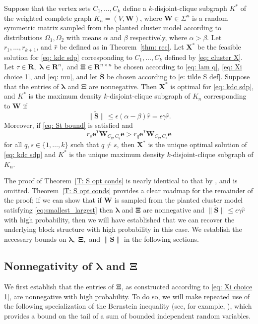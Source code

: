\documentclass[twoside,11pt]{article}
\newcommand{\R}{\mathbf{R}}
\newcommand{\St}{\bs{\tilde S}}
\newcommand{\e}{\bs {e}}
\newcommand{\bs}{\boldsymbol}
\newcommand{\X}{\bs {X}}
\newcommand{\W}{\bs {W}}
\newcommand{\0}{\bs{0}}
\begin{document}
{\begin{theorem} \label{T: S opt conds}
	Suppose that the vertex sets $C_1, \dots, C_k$ define a $k$-disjoint-clique subgraph $K^*$ of
	the weighted complete graph $K_n = (V, \W)$, where
	$\W \in \Sigma^n$ is a random symmetric matrix sampled from the planted cluster model
	according to distributions  $\Omega_1, \Omega_2$ with means $\alpha$ and $\beta$ respectively,
	where $\alpha > \beta$.
	Let $r_1, \dots, r_{k+1}$, and  $\hat r$ be defined as in Theorem~\ref{thm: rec}.
	Let $\X^*$ be the feasible solution for \eqref{eq: kdc sdp} corresponding to $C_1, \dots, C_k$ defined
	by \eqref{eq: cluster X}. Let $\tau \in \R,$ $\bs\lambda \in \R^n,$  and $\bs\Xi \in \R^{n\times n}$
	be chosen according to \eqref{eq: lam q},  \eqref{eq: Xi choice 1},
	and \eqref{eq: mu},
	and let $\St$ be chosen according to \eqref{e: tilde S def}.
	Suppose that the entries of  $\bs\lambda$ and  $\bs\Xi$ are nonnegative.
	Then
	$\X^*$ is optimal for \eqref{eq: kdc sdp}, and $K^*$  is the maximum density
	$k$-disjoint-clique
	subgraph of $K_n$ corresponding to $\W$ if
	\begin{equation} \label{eq: St bound}
	\| \St\| \le \epsilon (\alpha-\beta) \hat r = \epsilon \gamma \hat r .
	\end{equation}
	Moreover, if \eqref{eq: St bound} is satisfied and
	\begin{equation} \label{a: block weights}
	r_s \e^T \W_{C_q, C_q} \e > r_q \e^T \W_{C_q, C_s} \e
	\end{equation}
	for all $q, s \in \{1,\dots,k\}$ such that $q\neq s$,
	then $\X^*$ is the unique optimal solution of \eqref{eq: kdc sdp} and
	$K^*$ is the unique maximum density $k$-disjoint-clique
	subgraph of $K_n$.
\end{theorem}

The proof of Theorem~\ref{T: S opt conds} is nearly identical to that by \citet[Theorem~4.2]{ames2014guaranteed}, and is
omitted.
Theorem~\ref{T: S opt conds} provides a clear roadmap for the remainder of the proof; if we can show that if \(\W\) is sampled from the planted cluster
model satisfying \eqref{eq:smallest_largest} then \(\bs \lambda\)
and \(\bs \Xi\) are nonnegative and \(\|\St\| \le \epsilon \gamma \hat r\) with high probability, then we will have established that we can recover the underlying block
structure with high probability in this case. We establish the necessary bounds on \(\bs \lambda,\) \(\bs \Xi,\) and \(\|\St\|\)
in the following sections.

\subsection{Nonnegativity of \(\bs\lambda\) and \(\bs\Xi\)}
\label{sec: nonneg}
We first establish that the entries of \(\bs \Xi\), as constructed according to \eqref{eq: Xi choice 1},
are nonnegative with high probability.
To do so, we will make repeated use of the following specialization of the
Bernstein inequality (see, for example,
\citet[Theorem~6]{lugosi2009}),
which provides a  bound on the tail of a sum of bounded independent random variables.

}
\end{document}
